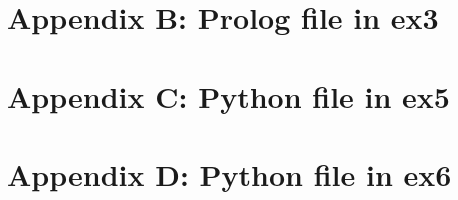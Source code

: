 \documentclass[12pt]{article}
\begin{document}
{\section{Appendix B: Prolog file in ex3}
\label{sec: AppendixB}


\section{Appendix C: Python file in ex5}
\label{sec: AppendixC}


\section{Appendix D: Python file in ex6}
\label{sec: AppendixD}



}
\end{document}
